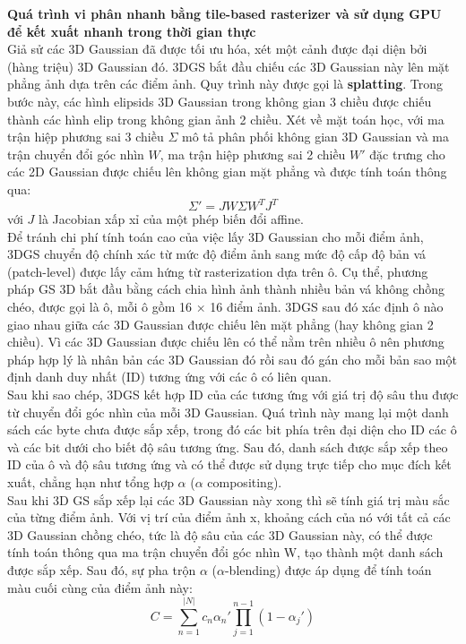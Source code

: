         \textbf{Quá trình vi phân nhanh bằng tile-based rasterizer và sử dụng GPU để kết xuất nhanh trong thời gian thực} \\

        Giả sử các 3D Gaussian đã được tối ưu hóa, xét một cảnh được đại diện bởi (hàng triệu) 3D Gaussian đó. 3DGS bắt đầu chiếu các 3D Gaussian này lên mặt phẳng ảnh dựa trên các điểm ảnh. Quy trình này được gọi là \textbf{splatting}. Trong bước này, các hình elipsids 3D Gaussian trong không gian 3 chiều được chiếu thành các hình elip trong không gian ảnh 2 chiều. Xét về mặt toán học, với ma trận hiệp phương sai 3 chiều $\Sigma$ mô tả phân phối không gian 3D Gaussian và ma trận chuyển đổi góc nhìn $W$, ma trận hiệp phương sai 2 chiều $W'$ đặc trưng cho các 2D Gaussian được chiếu lên không gian mặt phẳng và được tính toán thông qua:
        $$\Sigma' = JW\Sigma W^TJ^T$$
        với $J$ là Jacobian xấp xỉ của một phép biến đổi affine.\\
        
        Để tránh chi phí tính toán cao của việc lấy 3D Gaussian cho mỗi điểm ảnh, 3DGS chuyển độ chính xác từ mức độ điểm ảnh sang mức độ cấp độ bản vá (patch-level) được lấy cảm hứng từ rasterization dựa trên ô.  Cụ thể, phương pháp GS 3D bắt đầu bằng cách chia hình ảnh thành nhiều bản vá không chồng chéo, được gọi là ô, mỗi ô gồm 16 × 16 điểm ảnh. 3DGS sau đó xác định ô nào giao nhau giữa các 3D Gaussian được chiếu lên mặt phẳng (hay không gian 2 chiều). Vì các 3D Gaussian được chiếu lên có thể nằm trên nhiều ô nên phương pháp hợp lý là nhân bản các 3D Gaussian đó rồi sau đó gán cho mỗi bản sao một định danh duy nhất (ID) tương ứng với các ô có liên quan. \\

        Sau khi sao chép, 3DGS kết hợp ID của các tương ứng với giá trị độ sâu thu được từ chuyển đổi góc nhìn của mỗi 3D Gaussian. Quá trình này mang lại một danh sách các byte chưa được sắp xếp, trong đó các bit phía trên đại diện cho ID các ô và các bit dưới cho biết độ sâu tương ứng. Sau đó, danh sách được sắp xếp theo ID của ô và độ sâu tương ứng và có thể được sử dụng trực tiếp cho mục đích kết xuất, chẳng hạn như tổng hợp $\alpha$ ($\alpha$ compositing). \\

        Sau khi 3D GS sắp xếp lại các 3D Gaussian này xong thì sẽ tính giá trị màu sắc của từng điểm ảnh. Với vị trí của điểm ảnh x, khoảng cách của nó với tất cả các 3D Gaussian chồng chéo, tức là độ sâu của các 3D Gaussian này, có thể được tính toán thông qua ma trận chuyển đổi góc nhìn W, tạo thành một danh sách được sắp xếp. Sau đó, sự pha trộn $\alpha$ ($\alpha$-blending) được áp dụng để tính toán màu cuối cùng của điểm ảnh này:
        $$C = \sum^{|N|}_{n=1}c_n\alpha_n' \prod^{n-1}_{j=1}(1 - \alpha_j')$$

